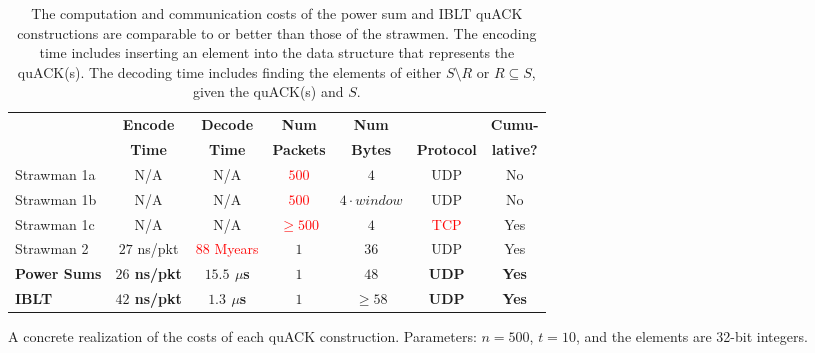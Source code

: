 \begin{table*}[ht]
  \begin{subtable}[b]{\linewidth}
  \centering
  \begin{tabular}{lcccccc}
    \toprule
    & \bf Encode & \bf Decode & \bf Num & \bf Num & \bf  & \bf Cumu- \\
    & \bf Time & \bf Time & \bf Packets & \bf Bytes & \bf Protocol & \bf lative? \\
    \midrule
    Strawman 1a & N/A & N/A & \textcolor{red}{$500$} & $4$ & UDP & No \\
    Strawman 1b & N/A & N/A & \textcolor{red}{$500$} & $4 \cdot window$ & UDP & No \\
    Strawman 1c & N/A & N/A & \textcolor{red}{$\geq 500$} & $4$ & \textcolor{red}{TCP} & Yes \\
    Strawman 2 & $27$ ns/pkt & \textcolor{red}{$88$ Myears} & $1$ & $36$ & UDP & Yes \\
    \bf \textcolor{black!50!blue}{Power Sums} & \bf \textcolor{black!50!blue}{$26$ ns/pkt} & \bf \textcolor{black!50!blue}{$15.5$ $\mu$s} & \bf \textcolor{black!50!blue}{$1$} & \bf \textcolor{black!50!blue}{$48$} & \bf \textcolor{black!50!blue}{UDP} & \bf \textcolor{black!50!blue}{Yes} \\
    \bf \textcolor{black!50!blue}{IBLT} & \bf \textcolor{black!50!blue}{$42$ ns/pkt} & \bf \textcolor{black!50!blue}{$1.3$ $\mu$s} & \bf \textcolor{black!50!blue}{$1$} & \bf \textcolor{black!50!blue}{$\geq 58$} & \bf \textcolor{black!50!blue}{UDP} & \bf \textcolor{black!50!blue}{Yes} \\
    \bottomrule
  \end{tabular}
  \caption{A concrete realization of the costs of each quACK construction.
  Parameters: $n=500$, $t=10$, and the elements are 32-bit integers.}
  \label{tab:quack:overview:practical}
  \end{subtable}

  \caption{ The computation and communication costs of the power sum and IBLT
  quACK constructions are comparable to or better than those of the strawmen.
  The encoding time includes inserting an element into the data structure that
  represents the quACK(s). The decoding time
   includes finding the elements of either $S \setminus R$ or $R \subseteq S$,
   given the quACK(s) and $S$.}
  \label{tab:quack:overview}
\end{table*}
